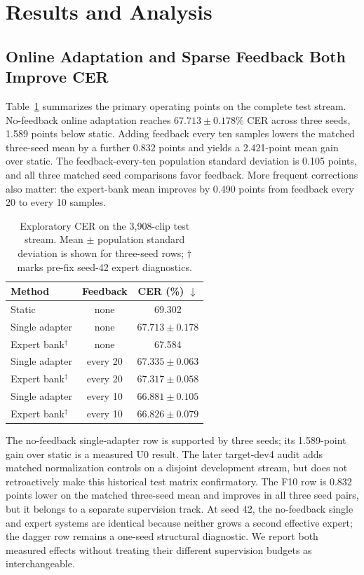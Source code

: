\section{Results and Analysis}
\label{sec:results}

\subsection{Online Adaptation and Sparse Feedback Both Improve CER}

Table~\ref{tab:main} summarizes the primary operating points on the complete test stream. No-feedback online adaptation reaches $67.713\pm0.178$\% CER across three seeds, 1.589 points below static. Adding feedback every ten samples lowers the matched three-seed mean by a further 0.832 points and yields a 2.421-point mean gain over static. The feedback-every-ten population standard deviation is 0.105 points, and all three matched seed comparisons favor feedback. More frequent corrections also matter: the expert-bank mean improves by 0.490 points from feedback every 20 to every 10 samples.

\begin{table}[t]
\centering
\caption{Exploratory CER on the 3,908-clip test stream. Mean $\pm$ population standard deviation is shown for three-seed rows; $\dagger$ marks pre-fix seed-42 expert diagnostics.}
\label{tab:main}
\begin{tabular}{lcc}
\toprule
Method & Feedback & CER (\%) $\downarrow$ \\
\midrule
Static & none & 69.302 \\
Single adapter & none & $67.713\pm0.178$ \\
Expert bank$^{\dagger}$ & none & 67.584 \\
Single adapter & every 20 & $67.335\pm0.063$ \\
Expert bank$^{\dagger}$ & every 20 & $67.317\pm0.058$ \\
Single adapter & every 10 & $66.881\pm0.105$ \\
Expert bank$^{\dagger}$ & every 10 & $66.826\pm0.079$ \\
\bottomrule
\end{tabular}
\end{table}

The no-feedback single-adapter row is supported by three seeds; its 1.589-point gain over static is a measured U0 result. The later target-dev4 audit adds matched normalization controls on a disjoint development stream, but does not retroactively make this historical test matrix confirmatory. The F10 row is 0.832 points lower on the matched three-seed mean and improves in all three seed pairs, but it belongs to a separate supervision track. At seed 42, the no-feedback single and expert systems are identical because neither grows a second effective expert; the dagger row remains a one-seed structural diagnostic. We report both measured effects without treating their different supervision budgets as interchangeable.

